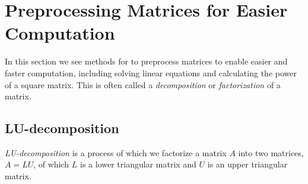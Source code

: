 \documentclass{report}
\begin{document}
		
\begin{comment}
		\subsection{Hermitian, Unitary, and Normal Matrices}
		If we talked about special real matrices, this section is on special complex matrices. Comparing with real matrices, Hermitian is similar to symmetric, Unitary is similar to Orthogonal.
		
		\begin{defn}[Conjugate Transpose of a Matrix]
			If $A$ is a complex matrix, then the \emph{conjugate transpose} of $A$, denoted by $A^*$, is defined by $A^*=\bar{A}^T$, where $\bar{A}$ indicates elementwise conjugation of the matrix.
		\end{defn}
		
		\begin{thm}
			If $k$ is a complex scalar and if $A, B, C$ are complex matrices whose sizes are such that the stated operations can be performed, then:
			\begin{enumerate}
				\item $(A^*)^*=A$
				\item $(A+B)^*=A^*+B^*$
				\item $(A-B)^*=A^*-B^*$
				\item $(kA)^*=\bar{k}A^*$
				\item $(AB)^*=B^*A^*$
			\end{enumerate}
		\end{thm}
\end{comment}
	
	\section{Preprocessing Matrices for Easier Computation}
	In this section we see methods for to preprocess matrices to enable easier and faster computation, including solving linear equations and calculating the power of a square matrix. This is often called a \emph{decomposition} or \emph{factorization} of a matrix.
	
		\subsection{LU-decomposition}
			\emph{LU-decomposition} is a process of which we factorize a matrix $A$ into two matrices, $A=LU$, of which $L$ is a lower triangular matrix and $U$ is an upper triangular matrix.
		
\end{document}
